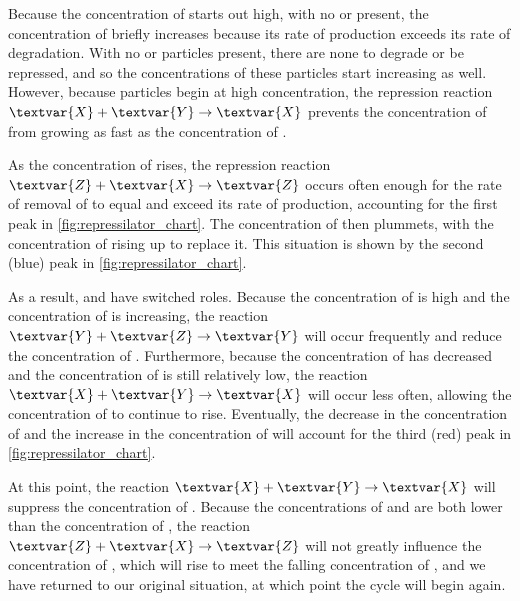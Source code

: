 Because the concentration of  starts out high, with no  or  present, the concentration of  briefly increases because its rate of production exceeds its rate of degradation. With no  or  particles present, there are none to degrade or be repressed, and so the concentrations of these particles start increasing as well. However, because  particles begin at high concentration, the repression reaction $\textvar{X} + \textvar{Y} \rightarrow \textvar{X}$ prevents the concentration of  from growing as fast as the concentration of .

As the concentration of  rises, the repression reaction $\textvar{Z} + \textvar{X} \rightarrow \textvar{Z}$ occurs often enough for the rate of removal of  to equal and exceed its rate of production, accounting for the first peak in \autoref{fig:repressilator_chart}. The concentration of  then plummets, with the concentration of  rising up to replace it. This situation is shown by the second (blue) peak in \autoref{fig:repressilator_chart}.

As a result,  and  have switched roles. Because the concentration of  is high and the concentration of  is increasing, the reaction $\textvar{Y} + \textvar{Z} \rightarrow \textvar{Y}$ will occur frequently and reduce the concentration of . Furthermore, because the concentration of  has decreased and the concentration of  is still relatively low, the reaction $\textvar{X} + \textvar{Y} \rightarrow \textvar{X}$ will occur less often, allowing the concentration of  to continue to rise. Eventually, the decrease in the concentration of  and the increase in the concentration of  will account for the third (red) peak in \autoref{fig:repressilator_chart}.

At this point, the reaction $\textvar{X} + \textvar{Y} \rightarrow \textvar{X}$ will suppress the concentration of . Because the concentrations of  and  are both lower than the concentration of , the reaction $\textvar{Z} + \textvar{X} \rightarrow \textvar{Z}$ will not greatly influence the concentration of , which will rise to meet the falling concentration of , and we have returned to our original situation, at which point the cycle will begin again.

\FloatBarrier
{}
